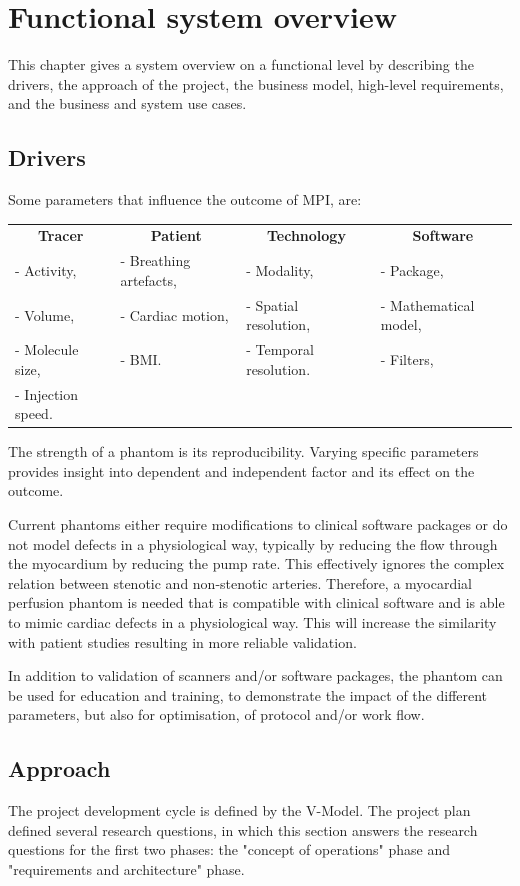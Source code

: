 \chapter{Functional system overview}
This chapter gives a system overview on a functional level by describing the drivers, the approach of the project, the business model, high-level requirements, and the business and system use cases.
\section{Drivers}
\label{sec:drivers}
Some parameters that influence the outcome of \ac{MPI}, are:

\begin{tabular}{llll}
 	\multicolumn{1}{c}{\textbf{Tracer}} & \multicolumn{1}{c}{\textbf{Patient}} & \multicolumn{1}{c}{\textbf{Technology}} & \multicolumn{1}{c}{\textbf{Software}} \\
		- Activity, & - Breathing artefacts, & - Modality, & - Package, \\
		- Volume, & - Cardiac motion, &  - Spatial resolution, & - Mathematical model, \\
		- Molecule size, & - BMI. & - Temporal resolution. & - Filters,\\
		- Injection speed.  & & & \makecell[l]{- \acs{ROI}.}\\
\end{tabular}

The strength of a phantom is its reproducibility. Varying specific parameters provides insight into dependent and independent factor and its effect on the outcome.

Current phantoms either require modifications to clinical software packages or do not model defects in a physiological way, typically by reducing the flow through the myocardium by reducing the pump rate. This effectively ignores the complex relation between stenotic and non-stenotic arteries. Therefore, a myocardial perfusion phantom is needed that is compatible with clinical software and is able to mimic cardiac defects in a physiological way. This will increase the similarity with patient studies resulting in more reliable validation.

In addition to validation of scanners and/or software packages, the phantom can be used for education and training, to demonstrate the impact of the different parameters, but also for optimisation, of protocol and/or work flow. 

\section{Approach}
The project development cycle is defined by the V-Model. The project plan defined several research questions, in which this section answers the research questions for the first two phases: the "concept of operations" phase and "requirements and architecture" phase.

